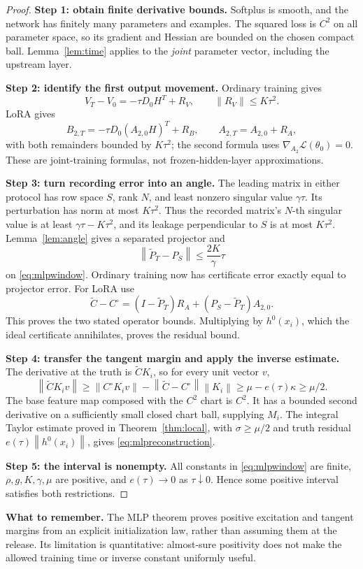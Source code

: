 \documentclass[12pt,a4paper]{article}
\theoremstyle{readable}
\theoremstyle{definition}\newtheorem{example}[theorem]{Example}
\newcommand{\norm}[1]{\left\|#1\right\|}
\newcommand{\takeaway}[1]{\par\textbf{What to remember.} #1\par}
\begin{document}
\begin{proof}
\textbf{Step 1: obtain finite derivative bounds.} Softplus is smooth, and the network has finitely many parameters and examples. The squared loss is \(C^2\) on all parameter space, so its gradient and Hessian are bounded on the chosen compact ball. Lemma~\ref{lem:time} applies to the \emph{joint} parameter vector, including the upstream layer.

\textbf{Step 2: identify the first output movement.} Ordinary training gives
\[
V_T-V_0=-\tau D_0H^T+R_V,\qquad \norm{R_V}\le K\tau^2.
\]
LoRA gives
\[
B_{2,T}=-\tau D_0(A_{2,0}H)^T+R_B,\qquad
A_{2,T}=A_{2,0}+R_A,
\]
with both remainders bounded by \(K\tau^2\); the second formula uses \(\nabla_{A_2}\mathcal L(\theta_0)=0\). These are joint-training formulas, not frozen-hidden-layer approximations.

\textbf{Step 3: turn recording error into an angle.} The leading matrix in either protocol has row space \(S\), rank \(N\), and least nonzero singular value \(\gamma\tau\). Its perturbation has norm at most \(K\tau^2\). Thus the recorded matrix's \(N\)-th singular value is at least \(\gamma\tau-K\tau^2\), and its leakage perpendicular to \(S\) is at most \(K\tau^2\). Lemma~\ref{lem:angle} gives a separated projector and
\[
\norm{\widetilde P_T-P_S}\le\frac{2K}{\gamma}\tau
\]
on \eqref{eq:mlpwindow}. Ordinary training now has certificate error exactly equal to projector error. For LoRA use
\[
\widetilde C-C^\circ
=(I-\widetilde P_T)R_A+(P_S-\widetilde P_T)A_{2,0}.
\]
This proves the two stated operator bounds. Multiplying by \(h^0(x_i)\), which the ideal certificate annihilates, proves the residual bound.

\textbf{Step 4: transfer the tangent margin and apply the inverse estimate.} The derivative at the truth is \(\widetilde C K_i\), so for every unit vector \(v\),
\[
\norm{\widetilde C K_iv}
\ge\norm{C^\circ K_iv}-\norm{\widetilde C-C^\circ}\norm{K_i}
\ge\mu-e(\tau)\kappa\ge\mu/2.
\]
The base feature map composed with the \(C^2\) chart is \(C^2\). It has a bounded second derivative on a sufficiently small closed chart ball, supplying \(M_i\). The integral Taylor estimate proved in Theorem~\ref{thm:local}, with \(\sigma\ge\mu/2\) and truth residual \(e(\tau)\norm{h^0(x_i)}\), gives \eqref{eq:mlpreconstruction}.

\textbf{Step 5: the interval is nonempty.} All constants in \eqref{eq:mlpwindow} are finite, \(\rho,g,K,\gamma,\mu\) are positive, and \(e(\tau)\to0\) as \(\tau\downarrow0\). Hence some positive interval satisfies both restrictions.
\end{proof}
\takeaway{The MLP theorem proves positive excitation and tangent margins from an explicit initialization law, rather than assuming them at the release. Its limitation is quantitative: almost-sure positivity does not make the allowed training time or inverse constant uniformly useful.}
\end{document}

